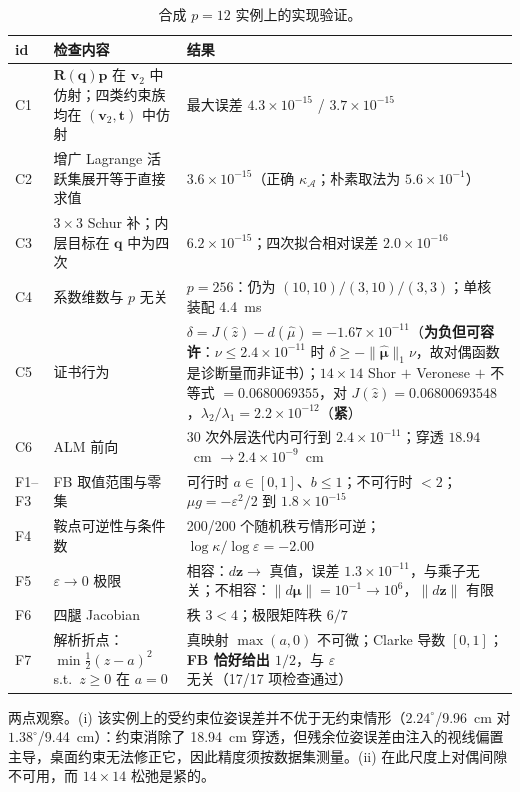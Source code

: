 \begin{table}[t]
\centering
\caption{合成 $p=12$ 实例上的实现验证。}
\label{tab:app_sanity}
\scriptsize
\setlength{\tabcolsep}{4pt}
\begin{tabular}{@{}p{0.8cm}p{7.2cm}p{7.6cm}@{}}
\toprule
id & 检查内容 & 结果 \\
\midrule
C1 & $\mathbf R(\mathbf q)\mathbf p$ 在 $\mathbf v_2$ 中仿射；四类约束族均在 $(\mathbf v_2,\mathbf t)$ 中仿射 & 最大误差 $4.3\times10^{-15}$ / $3.7\times10^{-15}$ \\
C2 & 增广 Lagrange 活跃集展开等于直接求值 & $3.6\times10^{-15}$（正确 $\kappa_{\mathcal A}$；朴素取法为 $5.6\times10^{-1}$） \\
C3 & $3\times3$ Schur 补；内层目标在 $\mathbf q$ 中为四次 & $6.2\times10^{-15}$；四次拟合相对误差 $2.0\times10^{-16}$ \\
C4 & 系数维数与 $p$ 无关 & $p=256$：仍为 $(10,10)/(3,10)/(3,3)$；单核装配 4.4~ms \\
C5 & 证书行为 & $\delta=J(\hat z)-d(\hat\mu)=-1.67\times10^{-11}$（\textbf{为负但可容许}：$\nu\le2.4\times10^{-11}$ 时 $\delta\ge-\|\hat{\boldsymbol\mu}\|_1\nu$，故对偶函数是诊断量而非证书）；$14\times14$ Shor $+$ Veronese $+$ 不等式 $=0.0680069355$，对 $J(\hat z)=0.06800693548$，$\lambda_2/\lambda_1=2.2\times10^{-12}$（\textbf{紧}） \\
C6 & ALM 前向 & 30 次外层迭代内可行到 $2.4\times10^{-11}$；穿透 $18.94$~cm $\to2.4\times10^{-9}$~cm \\
F1--F3 & FB 取值范围与零集 & 可行时 $a\in[0,1]$、$b\le1$；不可行时 $<2$；$\mu g=-\varepsilon^2/2$ 到 $1.8\times10^{-15}$ \\
F4 & 鞍点可逆性与条件数 & 200/200 个随机秩亏情形可逆；$\log\kappa/\log\varepsilon=-2.00$ \\
F5 & $\varepsilon\to0$ 极限 & 相容：$d\mathbf z\to$ 真值，误差 $1.3\times10^{-11}$，与乘子无关；不相容：$\|d\boldsymbol\mu\|=10^{-1}\to10^{6}$，$\|d\mathbf z\|$ 有限 \\
F6 & 四腿 Jacobian & 秩 $3<4$；极限矩阵秩 $6/7$ \\
F7 & 解析折点：$\min\tfrac12(z-a)^2$ s.t.\ $z\ge0$ 在 $a=0$ & 真映射 $\max(a,0)$ 不可微；Clarke 导数 $[0,1]$；\textbf{FB 恰好给出 $1/2$}，与 $\varepsilon$ 无关（17/17 项检查通过） \\
\bottomrule
\end{tabular}

\end{table}

两点观察。(i) 该实例上的受约束位姿误差并不优于无约束情形（$2.24^\circ$/9.96~cm 对 $1.38^\circ$/9.44~cm）：约束消除了 18.94~cm 穿透，但残余位姿误差由注入的视线偏置主导，桌面约束无法修正它，因此精度须按数据集测量。(ii) 在此尺度上对偶间隙不可用，而 $14\times14$ 松弛是紧的。

